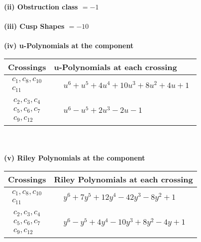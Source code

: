 \documentclass[1p]{elsarticle_modified}
\theoremstyle{definition}
\begin{document}
\flushleft \textbf{(ii) Obstruction class $= -1$}\\~\\
\flushleft \textbf{(iii) Cusp Shapes $= -10$}\\~\\
\newpage\renewcommand{\arraystretch}{1}
\flushleft \textbf{(iv) u-Polynomials at the component}\newline \\
\begin{tabular}{m{50pt}|m{274pt}}
Crossings & \hspace{64pt}u-Polynomials at each crossing \\
\hline $$\begin{aligned}c_{1},c_{8},c_{10}\\c_{11}\end{aligned}$$&$\begin{aligned}
&u^6+u^5+4 u^4+10 u^3+8 u^2+4 u+1
\end{aligned}$\\
\hline $$\begin{aligned}c_{2},c_{3},c_{4}\\c_{5},c_{6},c_{7}\\c_{9},c_{12}\end{aligned}$$&$\begin{aligned}
&u^6- u^5+2 u^3-2 u-1
\end{aligned}$\\
\hline
\end{tabular}\\~\\
\newpage\renewcommand{\arraystretch}{1}
\flushleft \textbf{(v) Riley Polynomials at the component}\newline \\
\begin{tabular}{m{50pt}|m{274pt}}
Crossings & \hspace{64pt}Riley Polynomials at each crossing \\
\hline $$\begin{aligned}c_{1},c_{8},c_{10}\\c_{11}\end{aligned}$$&$\begin{aligned}
&y^6+7 y^5+12 y^4-42 y^3-8 y^2+1
\end{aligned}$\\
\hline $$\begin{aligned}c_{2},c_{3},c_{4}\\c_{5},c_{6},c_{7}\\c_{9},c_{12}\end{aligned}$$&$\begin{aligned}
&y^6- y^5+4 y^4-10 y^3+8 y^2-4 y+1
\end{aligned}$\\
\hline
\end{tabular}\\~\\
\end{document}
